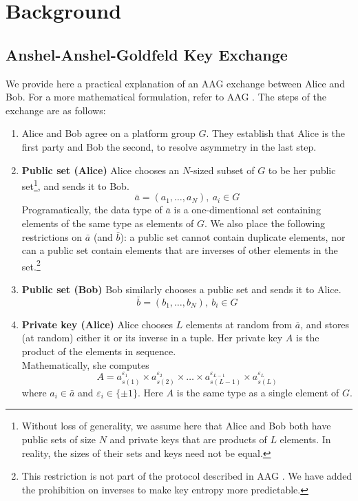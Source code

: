 \section{Background}
\label{sec:background}

\subsection{Anshel-Anshel-Goldfeld Key Exchange}\label{sec:bg-protocol}

We provide here a practical explanation of an AAG exchange between Alice and Bob. For a more mathematical formulation, refer to AAG \cite{aag}. The steps of the exchange are as follows:

\begin{enumerate}[1.]
	\item Alice and Bob agree on a platform group $G$. They establish that Alice is the first party and Bob the second, to resolve asymmetry in the last step.
	\item \textbf{Public set (Alice)} Alice chooses an $N$-sized subset of $G$ to be her public set\footnote{Without loss of generality, we assume here that Alice and Bob both have public sets of size $N$ and private keys that are products of $L$ elements. In reality, the sizes of their sets and keys need not be equal.}, and sends it to Bob.
		$$\bar{a} = (a_1, \ldots, a_{N}), \  a_i \in G$$
	Programatically, the data type of $\bar{a}$ is a one-dimentional set containing elements of the same type as elements of $G$.
    We also place the following restrictions on $\bar{a}$ (and $\bar{b}$): a public set cannot contain duplicate elements, nor can a public set contain elements that are inverses of other elements in the set.\footnote{This restriction is not part of the protocol described in AAG \cite{aag}. We have added the prohibition on inverses to make key entropy more predictable.}
	\item \textbf{Public set (Bob)} Bob similarly chooses a public set and sends it to Alice.
		$$\bar{b} = (b_1, \ldots, b_{N}), \ b_i \in G$$
	\item \textbf{Private key (Alice)} Alice chooses $L$ elements at random from $\overline{a}$, and stores (at random) either it or its inverse in a tuple. Her private key $A$ is the product of the elements in sequence.\\
		Mathematically, she computes
		$$A = a_{s(1)}^{\varepsilon_{1}} \times a_{s(2)}^{\varepsilon_{2}} \times \ldots \times a_{s(L-1)}^{\varepsilon_{L-1}} \times a_{s(L)}^{\varepsilon_L}$$ where $a_i \in \bar{a}$ and $\varepsilon_i \in \{\pm1\}$. Here $A$ is the same type as a single element of $G$. 
		

\end{enumerate}
